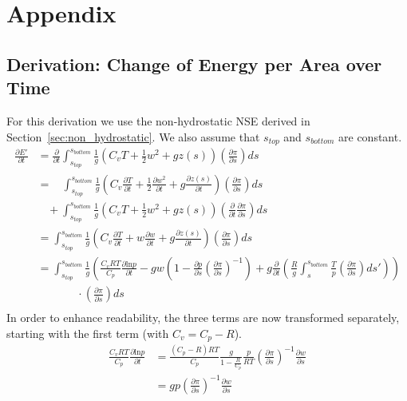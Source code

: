 \chapter{Appendix}
\section*{Derivation: Change of Energy per Area over Time}\label{sec:derivation:dE_dt}
For this derivation we use the non-hydrostatic NSE derived in Section~\ref{sec:non_hydrostatic}.
We also assume that $s_{top}$ and $s_{bottom}$ are constant.\\
\begin{align*}
\frac{\partial E'}{\partial t} &= \frac{\partial}{\partial t}\int_{s_{top}}^{s_{bottom}} \frac{1}{g}(C_vT+\frac{1}{2}w^2 + gz(s)) \left( \frac{\partial \pi}{\partial s} \right) ds\\
&=~~~~\int_{s_{top}}^{s_{bottom}} \frac{1}{g}\left(C_v\frac{\partial T}{\partial t}+\frac{1}{2}\frac{\partial w^2}{\partial t} + g\frac{\partial z(s)}{\partial t}\right) \left( \frac{\partial \pi}{\partial s} \right) ds \\&~~~~+ \int_{s_{top}}^{s_{bottom}} \frac{1}{g}(C_vT+\frac{1}{2}w^2 + gz(s)) \left( \frac{\partial}{\partial t}\frac{\partial \pi}{\partial s} \right) ds\\
&= \int_{s_{top}}^{s_{bottom}} \frac{1}{g}\left(C_v\frac{\partial T}{\partial t}+w\frac{\partial w}{\partial t} + g\frac{\partial z(s)}{\partial t}\right) \left( \frac{\partial \pi}{\partial s} \right) ds\\
&= \int_{s_{top}}^{s_{bottom}} \frac{1}{g}\left(\frac{C_vRT}{C_p}\frac{\partial \text{ln}p}{\partial t}-gw\left(1 - \frac{\partial p}{\partial s}\left(\frac{\partial \pi}{\partial s}\right)^{-1}\right) + g\frac{\partial}{\partial t}\left(\frac{R}{g}\int _s ^{s_{bottom}} \frac{T}{p}\left(\frac{\partial \pi}{\partial s}\right)ds'\right)\right) \\&~~~~~~~~~~~~~~~~\cdot\left( \frac{\partial \pi}{\partial s} \right) ds\\
\end{align*}
In order to enhance readability, the three terms are now transformed separately, starting with the first term (with $C_v=C_p-R$).
\begin{align*}
\frac{C_vRT}{C_p}\frac{\partial \text{ln}p}{\partial t} &= \frac{(C_p-R)RT}{C_p}\frac{g}{1- \frac{R}{C_p}} \frac{p}{RT}\left(\frac{\partial \pi}{\partial s}\right)^{-1} \frac{\partial w}{\partial s}\\
&= gp\left(\frac{\partial \pi}{\partial s}\right)^{-1} \frac{\partial w}{\partial s}
\end{align*}

